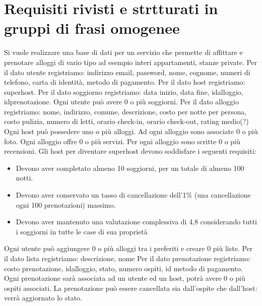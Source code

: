 \documentclass[12pt, letterpaper]{report}
\begin{document}
\section{Requisiti rivisti e strtturati in gruppi di frasi omogenee}
Si vuole realizzare una base di dati per un servizio che permette di affittare e prenotare
alloggi di vario tipo ad esempio interi appartamenti, stanze private.
\newline
\newline
Per il dato utente registriamo: indirizzo email, password, nome, cognome, numeri di telefono, carta di identità, metodo di pagamento.
\newline
\newline
Per il dato host registriamo: superhost.
\newline
\newline
Per il dato soggiorno registriamo: data inizio, data fine, idalloggio, idprenotazione.
Ogni utente può avere 0 o più soggiorni.
\newline
\newline
Per il dato alloggio registriamo: nome, indirizzo, comune, descrizione, costo per notte per  persona, costo pulizia, numero di letti, orario check-in, orario check-out, rating medio(?)
Ogni host può possedere uno o più alloggi. Ad ogni alloggio sono associate 0 o più foto. Ogni alloggio offre 0 o più servizi. Per ogni alloggio sono scritte 0 o più recensioni.
\newline
\newline
Gli host per diventare superhost devono soddisfare i  seguenti requisiti:
\begin{itemize}
    \item Devono aver completato almeno 10 soggiorni, per un totale di almeno 100 notti.
    \item Devono aver conservato un tasso di cancellazione dell'1\% 
    (una cancellazione ogni 100 prenotazioni) massimo.
    \item Devono aver mantenuto una valutazione complessiva di 4,8 considerando 
    tutti i soggiorni in tutte le case di sua proprietà
\end{itemize}
Ogni utente può aggiungere 0 o più alloggi tra i preferiti e creare 0 più liste.
Per il dato lista registriamo: descrizione, nome
\newline
\newline
Per il dato prenotazione registriamo: costo prenotazione, idalloggio, stato, numero ospiti, id metodo di pagamento. Ogni prenotazione sarà associata ad un utente ed un host, potrà avere 0 o più ospiti associati. La prenotazione può essere cancellata sia dall'ospite che dall'host: verrà aggiornato lo stato.
\end{document}
